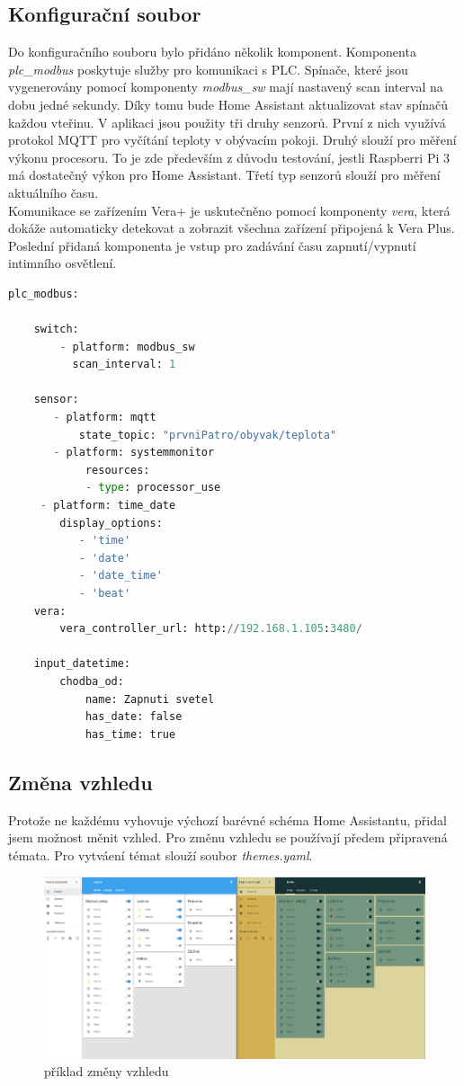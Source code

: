 \documentclass[a4paper,12pt,czech,bibliography=totoc]{scrbook}
\begin{document}
	\subsection{Konfigurační soubor}
Do konfiguračního souboru bylo přidáno několik komponent. Komponenta \textit{plc\_modbus} poskytuje služby pro komunikaci s PLC. Spínače, které jsou vygenerovány pomocí komponenty \textit{modbus\_sw} mají nastavený scan interval na dobu jedné sekundy. Díky tomu bude Home Assistant aktualizovat stav spínačů každou vteřinu. V aplikaci jsou použity tři druhy senzorů. První z nich využívá protokol MQTT pro vyčítání teploty v obývacím pokoji. Druhý slouží pro měření výkonu procesoru. To je zde především z důvodu testování, jestli Raspberri Pi 3 má dostatečný výkon pro Home Assistant. Třetí typ senzorů slouží pro měření aktuálního času.\\Komunikace se zařízením Vera+ je uskutečněno pomocí komponenty \textit{vera}, která dokáže automaticky detekovat a zobrazit všechna zařízení připojená k Vera Plus. Poslední přidaná komponenta je vstup pro zadávání času zapnutí/vypnutí intimního osvětlení.
			\begin{lstlisting}[language=Python]
	plc_modbus:

	switch:
		- platform: modbus_sw
		  scan_interval: 1

	sensor:
	   - platform: mqtt
		   state_topic: "prvniPatro/obyvak/teplota"
	   - platform: systemmonitor
	    	resources:
	    	- type: processor_use
     - platform: time_date
		display_options:
		   - 'time'
		   - 'date'
		   - 'date_time'
		   - 'beat'
	vera:
		vera_controller_url: http://192.168.1.105:3480/

	input_datetime:
		chodba_od:
			name: Zapnuti svetel
			has_date: false
			has_time: true
	\end{lstlisting}
	
	\subsection{Změna vzhledu}
	Protože ne každému vyhovuje výchozí barévné schéma Home Assistantu, přidal jsem možnost měnit vzhled. Pro změnu vzhledu se používají předem připravená témata.
	\newline
	Pro vytváení témat slouží soubor \textit{themes.yaml}.
	\begin{figure}[h]
		\centering
		\includegraphics[scale = 0.2]{theme.PNG}
		\caption{příklad změny vzhledu}
		\label{fig:my_label}
	\end{figure}
\end{document}
